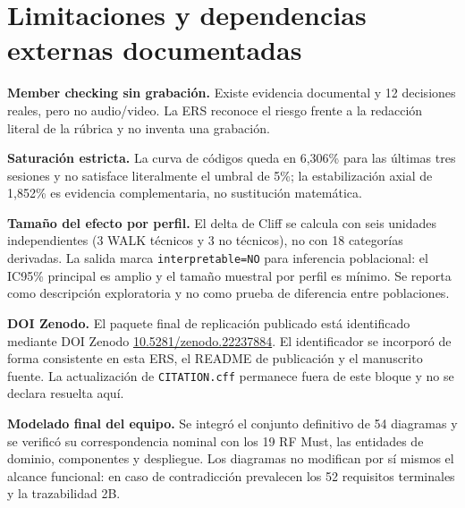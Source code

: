 \documentclass[11pt,a4paper,twoside]{article}
\begin{document}
\section{Limitaciones y dependencias externas documentadas}
\begin{riskbox}
\textbf{Member checking sin grabación.} Existe evidencia documental y 12 decisiones reales, pero no audio/video. La ERS reconoce el riesgo frente a la redacción literal de la rúbrica y no inventa una grabación.
\end{riskbox}
\begin{riskbox}
\textbf{Saturación estricta.} La curva de códigos queda en 6,306\% para las últimas tres sesiones y no satisface literalmente el umbral de 5\%; la estabilización axial de 1,852\% es evidencia complementaria, no sustitución matemática.
\end{riskbox}
\begin{riskbox}
\textbf{Tamaño del efecto por perfil.} El delta de Cliff se calcula con seis unidades independientes (3 WALK técnicos y 3 no técnicos), no con 18 categorías derivadas. La salida marca \texttt{interpretable=NO} para inferencia poblacional: el IC95\% principal es amplio y el tamaño muestral por perfil es mínimo. Se reporta como descripción exploratoria y no como prueba de diferencia entre poblaciones.
\end{riskbox}
\begin{riskbox}
\textbf{DOI Zenodo.} El paquete final de replicación publicado está identificado mediante DOI Zenodo \href{https://doi.org/10.5281/zenodo.22237884}{10.5281/zenodo.22237884}. El identificador se incorporó de forma consistente en esta ERS, el README de publicación y el manuscrito fuente. La actualización de \texttt{CITATION.cff} permanece fuera de este bloque y no se declara resuelta aquí.
\end{riskbox}
\begin{riskbox}
\textbf{Modelado final del equipo.} Se integró el conjunto definitivo de 54 diagramas y se verificó su correspondencia nominal con los 19 RF Must, las entidades de dominio, componentes y despliegue. Los diagramas no modifican por sí mismos el alcance funcional: en caso de contradicción prevalecen los 52 requisitos terminales y la trazabilidad 2B.
\end{riskbox}

\appendix
\end{document}
